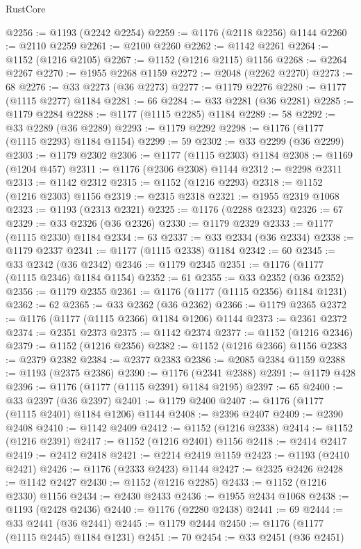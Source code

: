\begin{lexlean}{RustCore}
\begin{coremodule}
@2256 := @1193 (@2242 @2254)
@2259 := @1176 (@2118 @2256) @1144
@2260 := @2110 @2259
@2261 := @2100 @2260
@2262 := @1142 @2261
@2264 := @1152 (@1216 @2105)
@2267 := @1152 (@1216 @2115) @1156
@2268 := @2264 @2267
@2270 := @1955 @2268 @1159
@2272 := @2048 (@2262 @2270)
@2273 := 68
@2276 := @33 @2273 (@36 @2273)
@2277 := @1179 @2276
@2280 := @1177 (@1115 @2277) @1184
@2281 := 66
@2284 := @33 @2281 (@36 @2281)
@2285 := @1179 @2284
@2288 := @1177 (@1115 @2285) @1184
@2289 := 58
@2292 := @33 @2289 (@36 @2289)
@2293 := @1179 @2292
@2298 := @1176 (@1177 (@1115 @2293) @1184 @1154)
@2299 := 59
@2302 := @33 @2299 (@36 @2299)
@2303 := @1179 @2302
@2306 := @1177 (@1115 @2303) @1184
@2308 := @1169 (@1204 @457)
@2311 := @1176 (@2306 @2308) @1144
@2312 := @2298 @2311
@2313 := @1142 @2312
@2315 := @1152 (@1216 @2293)
@2318 := @1152 (@1216 @2303) @1156
@2319 := @2315 @2318
@2321 := @1955 @2319 @1068
@2323 := @1193 (@2313 @2321)
@2325 := @1176 (@2288 @2323)
@2326 := 67
@2329 := @33 @2326 (@36 @2326)
@2330 := @1179 @2329
@2333 := @1177 (@1115 @2330) @1184
@2334 := 63
@2337 := @33 @2334 (@36 @2334)
@2338 := @1179 @2337
@2341 := @1177 (@1115 @2338) @1184
@2342 := 60
@2345 := @33 @2342 (@36 @2342)
@2346 := @1179 @2345
@2351 := @1176 (@1177 (@1115 @2346) @1184 @1154)
@2352 := 61
@2355 := @33 @2352 (@36 @2352)
@2356 := @1179 @2355
@2361 := @1176 (@1177 (@1115 @2356) @1184 @1231)
@2362 := 62
@2365 := @33 @2362 (@36 @2362)
@2366 := @1179 @2365
@2372 := @1176 (@1177 (@1115 @2366) @1184 @1206) @1144
@2373 := @2361 @2372
@2374 := @2351 @2373
@2375 := @1142 @2374
@2377 := @1152 (@1216 @2346)
@2379 := @1152 (@1216 @2356)
@2382 := @1152 (@1216 @2366) @1156
@2383 := @2379 @2382
@2384 := @2377 @2383
@2386 := @2085 @2384 @1159
@2388 := @1193 (@2375 @2386)
@2390 := @1176 (@2341 @2388)
@2391 := @1179 @428
@2396 := @1176 (@1177 (@1115 @2391) @1184 @2195)
@2397 := 65
@2400 := @33 @2397 (@36 @2397)
@2401 := @1179 @2400
@2407 := @1176 (@1177 (@1115 @2401) @1184 @1206) @1144
@2408 := @2396 @2407
@2409 := @2390 @2408
@2410 := @1142 @2409
@2412 := @1152 (@1216 @2338)
@2414 := @1152 (@1216 @2391)
@2417 := @1152 (@1216 @2401) @1156
@2418 := @2414 @2417
@2419 := @2412 @2418
@2421 := @2214 @2419 @1159
@2423 := @1193 (@2410 @2421)
@2426 := @1176 (@2333 @2423) @1144
@2427 := @2325 @2426
@2428 := @1142 @2427
@2430 := @1152 (@1216 @2285)
@2433 := @1152 (@1216 @2330) @1156
@2434 := @2430 @2433
@2436 := @1955 @2434 @1068
@2438 := @1193 (@2428 @2436)
@2440 := @1176 (@2280 @2438)
@2441 := 69
@2444 := @33 @2441 (@36 @2441)
@2445 := @1179 @2444
@2450 := @1176 (@1177 (@1115 @2445) @1184 @1231)
@2451 := 70
@2454 := @33 @2451 (@36 @2451)

\end{coremodule}
\end{lexlean}
